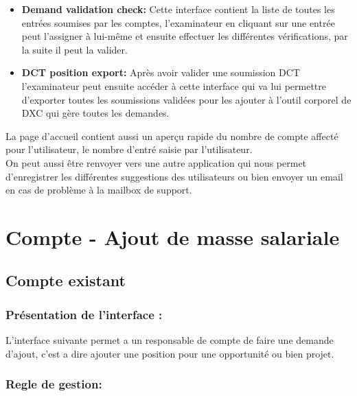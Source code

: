 \begin{itemize}
\begin{itemize}
             \begin{itemize}
                        \item[\ding{51}] \textbf{Demand validation check:} Cette interface contient la liste de toutes les entrées soumises par les comptes, l'examinateur en cliquant sur une entrée peut l'assigner à lui-même et ensuite effectuer les différentes vérifications, par la suite il peut la valider.
                        \item[\ding{51}] \textbf{DCT position export:} Après avoir valider une soumission DCT l'examinateur peut ensuite accéder à cette interface qui va lui permettre d'exporter toutes les soumissions validées pour les ajouter à l'outil corporel de DXC qui gère toutes les demandes.
                \end{itemize}
            
        \end{itemize}
    
\end{itemize}

La page d'accueil contient aussi un aperçu rapide du nombre de compte affecté pour l'utilisateur, le nombre d'entré saisie par l'utilisateur.
\\[0.3cm]
On peut aussi être renvoyer vers une autre application qui nous permet d'enregistrer les différentes suggestions des utilisateurs ou bien envoyer un email en cas de problème à la mailbox de support.

\section{Compte - Ajout de masse salariale}


\subsection{Compte existant}

\subsubsection{Présentation de l'interface :}

L'interface suivante permet a un responsable de compte de faire une demande d'ajout, c'est a dire ajouter une position pour une opportunité ou bien projet.


\subsubsection{Regle de gestion:}

